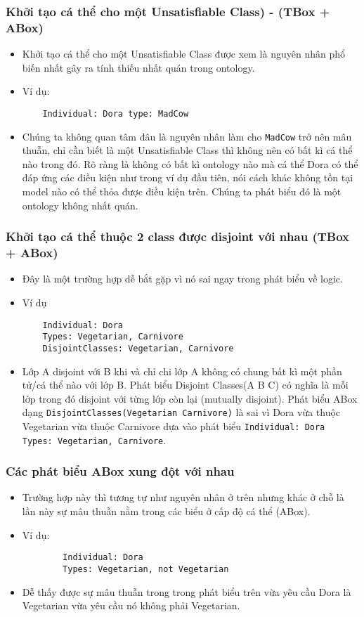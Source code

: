 \subsubsection{Khởi tạo cá thể cho một Unsatisfiable Class) - (TBox + ABox)}
\begin{itemize}
	\item
	Khởi tạo cá thể cho một Unsatisfiable Class được xem là nguyên nhân phổ biến nhất gây ra tính thiếu nhất quán trong ontology.
	\item
	Ví dụ:
	\begin{verbatim}
	Individual: Dora type: MadCow
	\end{verbatim}
	\item
	Chúng ta không quan tâm đâu là nguyên nhân làm cho \texttt{MadCow} trở nên mâu thuẫn, chỉ cần biết là một Unsatisfiable Class thì không nên có bất kì cá thể nào trong đó. Rõ ràng là không có bất kì ontology nào mà cá thể Dora có thể đáp ứng các điều kiện như trong ví dụ đầu tiên, nói cách khác không tồn tại model nào có thể thỏa được điều kiện trên. Chúng ta phát biểu đó là một ontology không nhất quán.
\end{itemize}
\subsubsection{Khởi tạo cá thể thuộc 2 class được disjoint với nhau (TBox + ABox)}
\begin{itemize}
	\item
	Đây là một trường hợp dễ bắt gặp vì nó sai ngay trong phát biểu về logic.
	\item Ví dụ
	\begin{verbatim}
	Individual: Dora
	Types: Vegetarian, Carnivore
	DisjointClasses: Vegetarian, Carnivore
	\end{verbatim}
	\item
	Lớp A disjoint với B khi và chỉ chi lớp A không có chung bất kì một phần tử/cá thể nào với lớp B. Phát biểu Disjoint Classes(A B C) có nghĩa là mỗi lớp trong đó disjoint với từng lớp còn lại (mutually disjoint). Phát biểu ABox dạng \texttt{DisjointClasses(Vegetarian Carnivore)} là sai vì Dora vừa thuộc Vegetarian vừa thuộc Carnivore dựa vào phát biểu \texttt{Individual: Dora Types: Vegetarian, Carnivore}.
\end{itemize}  	
\subsubsection{Các phát biểu ABox xung đột với nhau}
\begin{itemize} 
	\item{Trường hợp này thì tương tự như nguyên nhân ở trên nhưng khác ở chỗ là lần này sự mâu thuẫn nằm trong các biểu ở cấp độ cá thể (ABox).}
	\item{Ví dụ:	
		\begin{verbatim}
		Individual: Dora
		Types: Vegetarian, not Vegetarian
		\end{verbatim}
	}
	\item{Dễ thấy được sự mâu thuẫn trong trong phát biểu trên vừa yêu cầu Dora là Vegetarian vừa yêu cầu nó không phải Vegetarian.}
\end{itemize}
